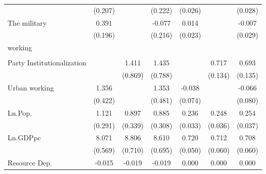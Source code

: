\begin{table}[htbp]
\begin{tabular}{l*{6}{c}}
                    &     (0.207)         &                     &     (0.222)         &     (0.026)         &                     &     (0.028)         \\
[1em]
The military        &       0.391\sym{*}  &                     &      -0.077         &       0.014         &                     &      -0.007         \\
                    &     (0.196)         &                     &     (0.216)         &     (0.023)         &                     &     (0.029)         \\
[1em]
working             &                     &                     &                     &                     &                     &                     \\
                    &                     &                     &                     &                     &                     &                     \\
[1em]
Party Institutionalization&                     &       1.411         &       1.435         &                     &       0.717\sym{***}&       0.693\sym{***}\\
                    &                     &     (0.869)         &     (0.788)         &                     &     (0.134)         &     (0.135)         \\
[1em]
Urban working       &       1.356\sym{**} &                     &       1.353\sym{**} &      -0.038         &                     &      -0.066         \\
                    &     (0.422)         &                     &     (0.481)         &     (0.074)         &                     &     (0.080)         \\
[1em]
Ln.Pop.             &       1.121\sym{***}&       0.897\sym{**} &       0.885\sym{**} &       0.236\sym{***}&       0.248\sym{***}&       0.254\sym{***}\\
                    &     (0.291)         &     (0.339)         &     (0.308)         &     (0.033)         &     (0.036)         &     (0.037)         \\
[1em]
Ln.GDPpc            &       8.071\sym{***}&       8.806\sym{***}&       8.610\sym{***}&       0.720\sym{***}&       0.712\sym{***}&       0.708\sym{***}\\
                    &     (0.569)         &     (0.710)         &     (0.695)         &     (0.050)         &     (0.060)         &     (0.060)         \\
[1em]
Resource Dep.       &      -0.015\sym{*}  &      -0.019\sym{**} &      -0.019\sym{**} &       0.000         &       0.000         &       0.000         \\

\end{tabular}
\end{table}
